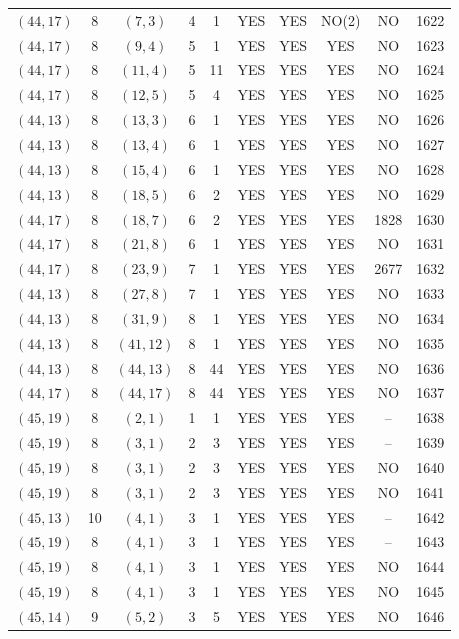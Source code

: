 \begin{longtable}{|c|c|c|c|c|c|c|c|c|c|}
$(44, 17)$ & 8 & $(7, 3)$ & 4 & 1 & YES & YES & NO(2) & NO & 1622\\
$(44, 17)$ & 8 & $(9, 4)$ & 5 & 1 & YES & YES & YES & NO & 1623\\
$(44, 17)$ & 8 & $(11, 4)$ & 5 & 11 & YES & YES & YES & NO & 1624\\
$(44, 17)$ & 8 & $(12, 5)$ & 5 & 4 & YES & YES & YES & NO & 1625\\
$(44, 13)$ & 8 & $(13, 3)$ & 6 & 1 & YES & YES & YES & NO & 1626\\
$(44, 13)$ & 8 & $(13, 4)$ & 6 & 1 & YES & YES & YES & NO & 1627\\
$(44, 13)$ & 8 & $(15, 4)$ & 6 & 1 & YES & YES & YES & NO & 1628\\
$(44, 13)$ & 8 & $(18, 5)$ & 6 & 2 & YES & YES & YES & NO & 1629\\
$(44, 17)$ & 8 & $(18, 7)$ & 6 & 2 & YES & YES & YES & 1828 & 1630\\
$(44, 17)$ & 8 & $(21, 8)$ & 6 & 1 & YES & YES & YES & NO & 1631\\
$(44, 17)$ & 8 & $(23, 9)$ & 7 & 1 & YES & YES & YES & 2677 & 1632\\
$(44, 13)$ & 8 & $(27, 8)$ & 7 & 1 & YES & YES & YES & NO & 1633\\
$(44, 13)$ & 8 & $(31, 9)$ & 8 & 1 & YES & YES & YES & NO & 1634\\
$(44, 13)$ & 8 & $(41, 12)$ & 8 & 1 & YES & YES & YES & NO & 1635\\
$(44, 13)$ & 8 & $(44, 13)$ & 8 & 44 & YES & YES & YES & NO & 1636\\
$(44, 17)$ & 8 & $(44, 17)$ & 8 & 44 & YES & YES & YES & NO & 1637\\
$(45, 19)$ & 8 & $(2, 1)$ & 1 & 1 & YES & YES & YES & -- & 1638\\
$(45, 19)$ & 8 & $(3, 1)$ & 2 & 3 & YES & YES & YES & -- & 1639\\
$(45, 19)$ & 8 & $(3, 1)$ & 2 & 3 & YES & YES & YES & NO & 1640\\
$(45, 19)$ & 8 & $(3, 1)$ & 2 & 3 & YES & YES & YES & NO & 1641\\
$(45, 13)$ & 10 & $(4, 1)$ & 3 & 1 & YES & YES & YES & -- & 1642\\
$(45, 19)$ & 8 & $(4, 1)$ & 3 & 1 & YES & YES & YES & -- & 1643\\
$(45, 19)$ & 8 & $(4, 1)$ & 3 & 1 & YES & YES & YES & NO & 1644\\
$(45, 19)$ & 8 & $(4, 1)$ & 3 & 1 & YES & YES & YES & NO & 1645\\
$(45, 14)$ & 9 & $(5, 2)$ & 3 & 5 & YES & YES & YES & NO & 1646\\

\end{longtable}
